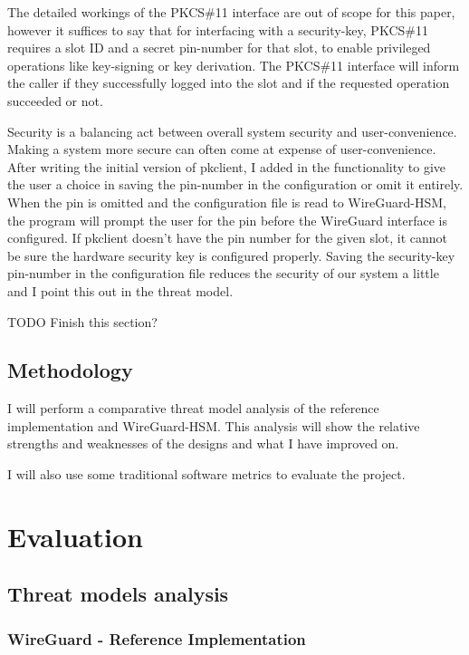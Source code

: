 \documentclass [11pt, proquest] {uwthesis}[2020/02/24]
\begin{document}
The detailed workings of the PKCS\#11 interface are out of scope for this paper, however it suffices to say that for interfacing with a security-key, PKCS\#11 requires a slot ID and a secret pin-number for that slot, to enable privileged operations like key-signing or key derivation. The PKCS\#11 interface will inform the caller if they successfully logged into the slot and if the requested operation succeeded or not.

Security is a balancing act between overall system security and user-convenience. Making a system more secure can often come at expense of user-convenience. After writing the initial version of pkclient, I added in the functionality to give the user a choice in saving the pin-number in the configuration or omit it entirely. When the pin is omitted and the configuration file is read to WireGuard-HSM, the program will prompt the user for the pin before the WireGuard interface is configured. If pkclient doesn't have the pin number for the given slot, it cannot be sure the hardware security key is configured properly. Saving the security-key pin-number in the configuration file reduces the security of our system a little and I point this out in the threat model. 

TODO Finish this section?



\section {Methodology}
I will perform a comparative threat model analysis of the reference implementation and WireGuard-HSM. This analysis will show the relative strengths and weaknesses of the designs and what I have improved on.

I will also use some traditional software metrics to evaluate the project.

\chapter {Evaluation}
\section{Threat models analysis}

\subsection {WireGuard - Reference Implementation}
\label{wg-ref-analysis}
\end{document}
